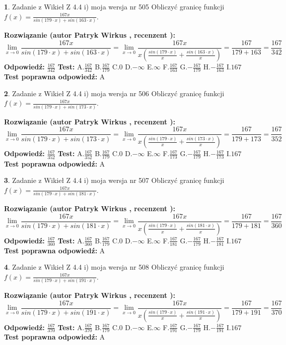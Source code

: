 \documentclass[12pt, a4paper]{article}
\theoremstyle{definition} %
\newtheorem{zad}{}
\newcommand{\zadStart}[1]{\begin{zad}#1\newline}
\newcommand{\zadStop}{\end{zad}}
\newcommand{\rozwStart}[2]{\noindent \textbf{Rozwiązanie (autor #1 , recenzent #2): }\newline}
\newcommand{\rozwStop}{\newline}
\newcommand{\odpStart}{\noindent \textbf{Odpowiedź:}\newline}
\newcommand{\odpStop}{\newline}
\newcommand{\testStart}{\noindent \textbf{Test:}\newline}
\newcommand{\testStop}{\newline}
\newcommand{\kluczStart}{\noindent \textbf{Test poprawna odpowiedź:}\newline}
\newcommand{\kluczStop}{\newline}
\begin{document}
\zadStart{Zadanie z Wikieł Z 4.4 i) moja wersja nr 505}
Obliczyć granicę funkcji $f(x)=\frac{167x}{sin(179\cdot x) +sin(163\cdot x)}$.
\zadStop
\rozwStart{Patryk Wirkus}{}
$$\lim\limits_{x\to 0}\frac{167x}{sin(179\cdot x) +sin(163\cdot x)}=\lim\limits_{x\to 0}\frac{167x}{x(\frac{sin(179\cdot x)}{x}+\frac{sin(163\cdot x)}{x})}=\frac{167}{179+163} = \frac{167}{342}$$
\rozwStop
\odpStart
$\frac{167}{342}$
\odpStop
\testStart
A.$\frac{167}{342}$
B.$\frac{167}{179}$
C.$0$
D.$-\infty$
E.$\infty$
F.$\frac{167}{163}$
G.$-\frac{167}{179}$
H.$-\frac{167}{163}$
I.$167$
\testStop
\kluczStart
A
\kluczStop



\zadStart{Zadanie z Wikieł Z 4.4 i) moja wersja nr 506}
Obliczyć granicę funkcji $f(x)=\frac{167x}{sin(179\cdot x) +sin(173\cdot x)}$.
\zadStop
\rozwStart{Patryk Wirkus}{}
$$\lim\limits_{x\to 0}\frac{167x}{sin(179\cdot x) +sin(173\cdot x)}=\lim\limits_{x\to 0}\frac{167x}{x(\frac{sin(179\cdot x)}{x}+\frac{sin(173\cdot x)}{x})}=\frac{167}{179+173} = \frac{167}{352}$$
\rozwStop
\odpStart
$\frac{167}{352}$
\odpStop
\testStart
A.$\frac{167}{352}$
B.$\frac{167}{179}$
C.$0$
D.$-\infty$
E.$\infty$
F.$\frac{167}{173}$
G.$-\frac{167}{179}$
H.$-\frac{167}{173}$
I.$167$
\testStop
\kluczStart
A
\kluczStop



\zadStart{Zadanie z Wikieł Z 4.4 i) moja wersja nr 507}
Obliczyć granicę funkcji $f(x)=\frac{167x}{sin(179\cdot x) +sin(181\cdot x)}$.
\zadStop
\rozwStart{Patryk Wirkus}{}
$$\lim\limits_{x\to 0}\frac{167x}{sin(179\cdot x) +sin(181\cdot x)}=\lim\limits_{x\to 0}\frac{167x}{x(\frac{sin(179\cdot x)}{x}+\frac{sin(181\cdot x)}{x})}=\frac{167}{179+181} = \frac{167}{360}$$
\rozwStop
\odpStart
$\frac{167}{360}$
\odpStop
\testStart
A.$\frac{167}{360}$
B.$\frac{167}{179}$
C.$0$
D.$-\infty$
E.$\infty$
F.$\frac{167}{181}$
G.$-\frac{167}{179}$
H.$-\frac{167}{181}$
I.$167$
\testStop
\kluczStart
A
\kluczStop



\zadStart{Zadanie z Wikieł Z 4.4 i) moja wersja nr 508}
Obliczyć granicę funkcji $f(x)=\frac{167x}{sin(179\cdot x) +sin(191\cdot x)}$.
\zadStop
\rozwStart{Patryk Wirkus}{}
$$\lim\limits_{x\to 0}\frac{167x}{sin(179\cdot x) +sin(191\cdot x)}=\lim\limits_{x\to 0}\frac{167x}{x(\frac{sin(179\cdot x)}{x}+\frac{sin(191\cdot x)}{x})}=\frac{167}{179+191} = \frac{167}{370}$$
\rozwStop
\odpStart
$\frac{167}{370}$
\odpStop
\testStart
A.$\frac{167}{370}$
B.$\frac{167}{179}$
C.$0$
D.$-\infty$
E.$\infty$
F.$\frac{167}{191}$
G.$-\frac{167}{179}$
H.$-\frac{167}{191}$
I.$167$
\testStop
\kluczStart
A
\kluczStop
\end{document}
